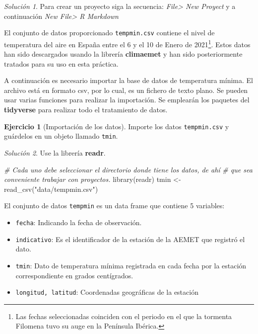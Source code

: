 \documentclass[
]{book}
\newenvironment{Shaded}{\begin{snugshade}}{\end{snugshade}}
\newcommand{\CommentTok}[1]{\textcolor[rgb]{0.56,0.35,0.01}{\textit{#1}}}
\newcommand{\FunctionTok}[1]{\textcolor[rgb]{0.00,0.00,0.00}{#1}}
\newcommand{\NormalTok}[1]{#1}
\newcommand{\OtherTok}[1]{\textcolor[rgb]{0.56,0.35,0.01}{#1}}
\newcommand{\StringTok}[1]{\textcolor[rgb]{0.31,0.60,0.02}{#1}}
\theoremstyle{definition}
\theoremstyle{definition}
\theoremstyle{definition}
\newtheorem{exercise}{Ejercicio}[chapter]
\theoremstyle{definition}
\theoremstyle{remark}
\newtheorem*{solution}{Solución}
\begin{document}
\begin{solution}
Para crear un proyecto siga la secuencia: \emph{File\textgreater{} New Proyect} y a continuación
\emph{New File\textgreater{} R Markdown}
\end{solution}

El conjunto de datos proporcionado \texttt{tempmin.csv} contiene el nivel de
temperatura del aire en España entre el 6 y el 10 de Enero de
2021\footnote{Las fechas seleccionadas coinciden con el periodo en el que
  la tormenta Filomena tuvo su auge en la Península Ibérica.}. Estos datos han sido descargados usando la librería
\textbf{climaemet} \citep{R-climaemet} y han sido posteriormente tratados para su uso en
esta práctica.

A continuación es necesario importar la base de datos de temperatura mínima. El
archivo está en formato csv, por lo cual, es un fichero de texto plano. Se
pueden usar varias funciones para realizar la importación. Se emplearán los
paquetes del \textbf{tidyverse} \citep{R-tidyverse} para realizar todo el tratamiento de
datos.

\begin{exercise}[Importación de los datos]
\protect\hypertarget{exr:ex2}{}\label{exr:ex2}Importe los datos \texttt{tempmin.csv} y guárdelos en un objeto llamado \texttt{tmin}.
\end{exercise}

\begin{solution}
Use la librería \textbf{readr}.
\end{solution}

\begin{Shaded}
\begin{Highlighting}[]
\CommentTok{\# Cada uno debe seleccionar el directorio donde tiene los datos, de ahí}
\CommentTok{\# que sea conveniente trabajar con proyectos.}
\FunctionTok{library}\NormalTok{(readr)}
\NormalTok{tmin }\OtherTok{\textless{}{-}} \FunctionTok{read\_csv}\NormalTok{(}\StringTok{"data/tempmin.csv"}\NormalTok{)}
\end{Highlighting}
\end{Shaded}

El conjunto de datos \texttt{tempmin} es un data frame que contiene 5 variables:

\begin{itemize}
\item
  \texttt{fecha}: Indicando la fecha de observación.
\item
  \texttt{indicativo}: Es el identificador de la estación de la AEMET que registró el
  dato.
\item
  \texttt{tmin}: Dato de temperatura mínima registrada en cada fecha por la estación
  correspondiente en grados centígrados.
\item
  \texttt{longitud,\ latitud}: Coordenadas geográficas de la estación
\end{itemize}
\end{document}
